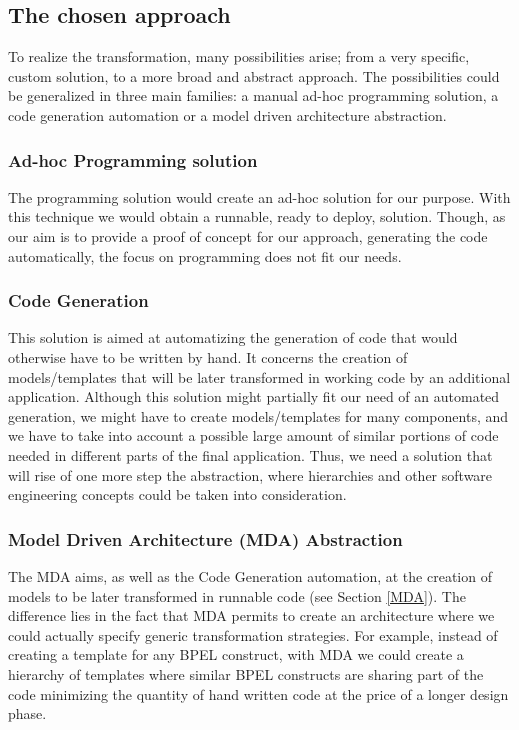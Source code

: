 \subsection{The chosen approach}
\label{sec:ProgrammingVsMDE}
To realize the transformation, many possibilities arise; from a very specific, custom solution, to a more broad and abstract approach. The possibilities could be generalized in three main families: a manual ad-hoc programming solution, a code generation automation or a model driven architecture abstraction.
  \subsubsection{Ad-hoc Programming solution}
The programming solution would create an ad-hoc solution for our purpose. With this technique we would obtain a runnable, ready to deploy, solution. Though, as our aim is to provide a proof of concept for our approach, generating the code automatically, the focus on programming does not fit our needs.
  \subsubsection{Code Generation}
This solution is aimed at automatizing the generation of code that would otherwise have to be written by hand. It concerns the creation of models/templates that will be later transformed in working code by an additional application. Although this solution might partially fit our need of an automated generation, we might have to create models/templates for many components, and we have to take into account a possible large amount of similar portions of code needed in different parts of the final application.  Thus, we need a solution that will rise of one more step the abstraction, where hierarchies and other software engineering concepts could be taken into consideration.
  
 \subsubsection{Model Driven Architecture (MDA) Abstraction}
The MDA aims, as well as the Code Generation automation, at the creation of models to be later transformed in runnable code (see Section \ref{MDA}). The difference lies in the fact that MDA permits to create an architecture where we could actually specify generic transformation strategies. For example, instead of creating a template for any BPEL construct, with MDA we could create a hierarchy of templates where similar BPEL constructs are sharing part of the code minimizing the quantity of hand written code at the price of a longer design phase.
